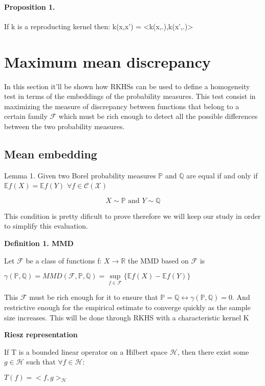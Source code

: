 \documentclass[8pt,a4paper]{article}
\begin{document}
\paragraph*{Proposition 1.}
If k is a reproducting kernel then: k(x,x') = <k(x,.),k(x',.)>
\section{Maximum mean discrepancy}
In this section it'll be shown how RKHSs can be used to define a homogeneity test in terms of the embeddings of the probability measures.
This test consist in maximizing the measure of discrepancy between functions that belong to a certain family $\mathcal{F}$ which must be rich enough to detect all the possible differences between the two probability measures.
\subsection{Mean embedding}
\textsf{Lemma 1.} Given two Borel probability measures $\mathbb{P}$ and $\mathbb{Q}$  are equal if and only if $\mathbb{E}f(X) = \mathbb{E}f(Y)$  $\forall f \in \mathcal{C(X)}$

$$X \sim \mathbb{P} \text{ and } Y \sim \mathbb{Q}$$
\begin{flushleft}
This condition is pretty dificult to prove therefore we will keep our study in order to simplify this evaluation.
\end{flushleft}

\textsf{\textbf{Definition 1. MMD}}
\begin{flushleft}

Let $\mathcal{F}$ be a class of functions f: $X \rightarrow \mathbb{R}$ the MMD based on $\mathcal{F}$ is
\end{flushleft}

\begin{center}
$\gamma(\mathbb{P},\mathbb{Q}) = MMD(\mathcal{F},\mathbb{P},\mathbb{Q}) =  \sup\limits_{f\in\mathcal{F}}\{\mathbb{E}f(X) -\mathbb{E}f(Y)\}$
\end{center}
\begin{flushleft}
This $\mathcal{F}$ must be rich enough for it to ensure that $\mathbb{P} = \mathbb{Q} \leftrightarrow \gamma(\mathbb{P},\mathbb{Q}) = 0$. And restrictive enough for the empirical estimate to converge quickly as the sample size increases.
This will be done through RKHS with a characteristic kernel K
\end{flushleft}

\textsf{\textbf{Riesz representation}}
\begin{flushleft}
If T is a bounded linear operator on a Hilbert space $\mathcal{H}$, then there exist some $g \in \mathcal{H}$ such that $\forall f \in \mathcal{H}$:
\end{flushleft}
\begin{center}
$T(f) = <f,g>_{\mathcal{H}}$
\end{center}
\end{document}
